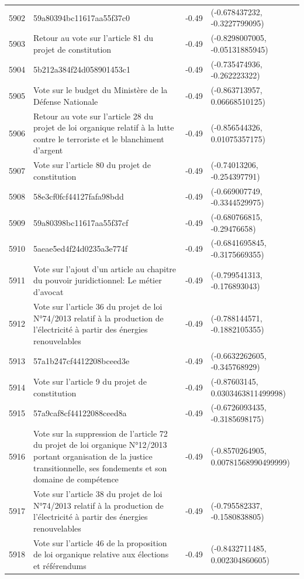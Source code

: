 \begin{table}[ht]
\begin{tabular}{rlrl}
  5902 & 59a80394bc11617aa55f37c0 & -0.49 & (-0.678437232, -0.3227799095) \\ 
  5903 & Retour au vote sur l'article 81 du projet de constitution & -0.49 & (-0.8298007005, -0.05131885945) \\ 
  5904 & 5b212a384f24d058901453c1 & -0.49 & (-0.735474936, -0.262223322) \\ 
  5905 & Vote sur le budget du Ministère de la Défense Nationale & -0.49 & (-0.863713957, 0.06668510125) \\ 
  5906 & Retour au vote sur l'article 28 du projet de loi organique relatif à la lutte contre le terroriste et le blanchiment d'argent & -0.49 & (-0.856544326, 0.01075357175) \\ 
  5907 & Vote sur l'article 80 du projet de constitution & -0.49 & (-0.74013206, -0.254397791) \\ 
  5908 & 58e3cf0fcf44127fafa98bdd & -0.49 & (-0.669007749, -0.3344529975) \\ 
  5909 & 59a80398bc11617aa55f37cf & -0.49 & (-0.680766815, -0.29476658) \\ 
  5910 & 5aeae5ed4f24d0235a3e774f & -0.49 & (-0.6841695845, -0.3175669355) \\ 
  5911 & Vote sur l'ajout d'un article au chapitre du pouvoir juridictionnel: Le métier d'avocat & -0.49 & (-0.799541313, -0.176893043) \\ 
  5912 & Vote sur l'article 36 du projet de loi N°74/2013 relatif à la production de l'électricité à partir des énergies renouvelables & -0.49 & (-0.788144571, -0.1882105355) \\ 
  5913 & 57a1b247cf4412208bceed3e & -0.49 & (-0.6632262605, -0.345768929) \\ 
  5914 & Vote sur l'article 9 du projet de constitution & -0.49 & (-0.87603145, 0.0303463811499998) \\ 
  5915 & 57a9caf8cf44122088ceed8a & -0.49 & (-0.6726093435, -0.3185698175) \\ 
  5916 & Vote sur la suppression de l'article 72 du projet de loi organique N°12/2013 portant organisation de la justice transitionnelle, ses fondements et son domaine de compétence & -0.49 & (-0.8570264905, 0.00781568990499999) \\ 
  5917 & Vote sur l'article 38 du projet de loi N°74/2013 relatif à la production de l'électricité à partir des énergies renouvelables & -0.49 & (-0.795582337, -0.1580838805) \\ 
  5918 & Vote sur l'article 46 de la proposition de loi organique relative aux élections et référendums & -0.49 & (-0.8432711485, 0.002304860605) \\ 

\end{tabular}
\end{table}
